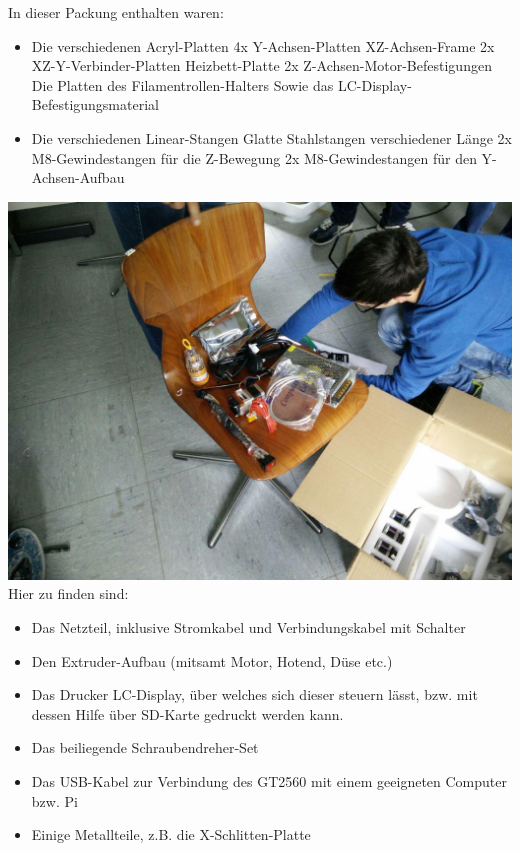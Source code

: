 In dieser Packung enthalten waren:
\begin{itemize}[noitemsep]
\item Die verschiedenen Acryl-Platten
\subitem 4x Y-Achsen-Platten
\subitem XZ-Achsen-Frame
\subitem 2x XZ-Y-Verbinder-Platten
\subitem Heizbett-Platte
\subitem 2x Z-Achsen-Motor-Befestigungen
\subitem Die Platten des Filamentrollen-Halters
\subitem Sowie das LC-Display-Befestigungsmaterial

\item Die verschiedenen Linear-Stangen
\subitem Glatte Stahlstangen verschiedener Länge
\subitem 2x M8-Gewindestangen für die Z-Bewegung
\subitem 2x M8-Gewindestangen für den Y-Achsen-Aufbau
\end{itemize}
\vspace{\linewidth}
\includegraphics[clip=true,trim=260 180 230 160,width=\textwidth]{Bilder/Material_3.jpg}
Hier zu finden sind:
\begin{itemize}[noitemsep]
\item Das Netzteil, inklusive Stromkabel und Verbindungskabel mit Schalter
\item Den Extruder-Aufbau (mitsamt Motor, Hotend, Düse etc.)
\item Das Drucker LC-Display, über welches sich dieser steuern lässt, bzw. mit dessen Hilfe über SD-Karte gedruckt werden kann.
\item Das beiliegende Schraubendreher-Set
\item Das USB-Kabel zur Verbindung des GT2560 mit einem geeigneten Computer bzw. Pi
\item Einige Metallteile, z.B. die X-Schlitten-Platte
\end{itemize}


